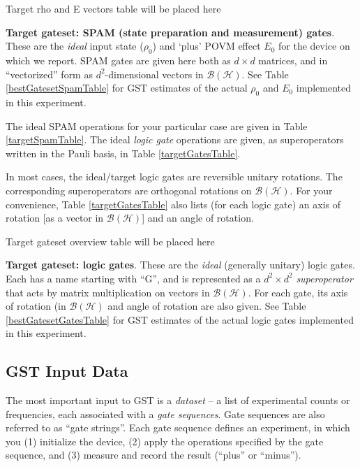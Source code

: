 \documentclass{article}[11pt]
\newcommand{\putfield}[2]{#2}
\begin{document}
\begin{table}[h]
\begin{center}
\putfield{targetSpamTable}{Target rho and E vectors table will be placed here}
\caption{\textbf{Target gateset: SPAM (state preparation and measurement) gates}.  These are the \emph{ideal} input state ($\rho_0$) and `plus' POVM effect $E_0$ for the device on which we report.  SPAM gates are given here both as $d\times d$ matrices, and in ``vectorized'' form as $d^2$-dimensional vectors in $\mathcal{B}(\mathcal{H})$.  See Table \ref{bestGatesetSpamTable} for GST estimates of the actual $\rho_0$ and $E_0$ implemented in this experiment.\label{targetSpamTable}}
\end{center}
\end{table}

The ideal SPAM operations for your particular case are given in Table \ref{targetSpamTable}.  The ideal \emph{logic gate} operations are given, as superoperators written in the Pauli basis, in Table \ref{targetGatesTable}.

In most cases, the ideal/target logic gates are reversible unitary rotations.  The corresponding superoperators are orthogonal rotations on $\mathcal{B}(\mathcal{H})$.  For your convenience, Table \ref{targetGatesTable} also lists (for each logic gate) an axis of rotation [as a vector in $\mathcal{B}(\mathcal{H})$] and an angle of rotation.  

\begin{table}[h]
\begin{center}
\putfield{targetGatesTable}{Target gateset overview table will be placed here}
\caption{\textbf{Target gateset: logic gates}.  These are the \emph{ideal} (generally unitary) logic gates.  Each has a name starting with ``G'', and is represented as a $d^2\times d^2$ \emph{superoperator} that acts by matrix multiplication on vectors in $\mathcal{B}(\mathcal{H})$.  For each gate, its axis of rotation (in $\mathcal{B}(\mathcal{H})$ and angle of rotation are also given.  See Table \ref{bestGatesetGatesTable} for GST estimates of the actual logic gates implemented in this experiment.\label{targetGatesTable}}
\end{center}
\end{table}

\subsection{GST Input Data}

The most important input to GST is a \emph{dataset} -- a list of experimental counts or frequencies, each associated with a \emph{gate sequences}.  Gate sequences are also referred to as ``gate strings''.  Each gate sequence defines an experiment, in which you (1) initialize the device, (2) apply the operations specified by the gate sequence, and (3) measure and record the result (``plus'' or ``minus'').
\end{document}
